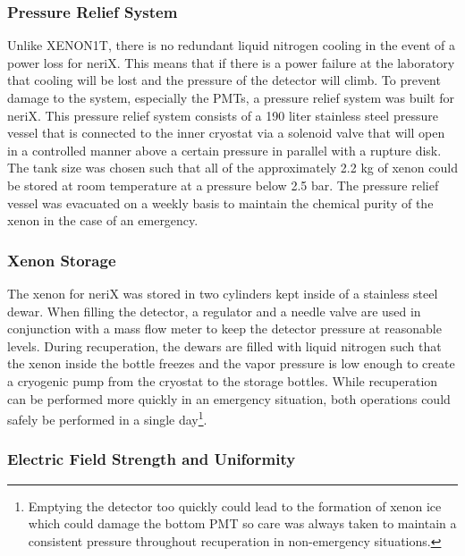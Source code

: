 \subsubsection{Pressure Relief System}

Unlike XENON1T, there is no redundant liquid nitrogen cooling in the event of a power loss for neriX.  This means that if there is a power failure at the laboratory that cooling will be lost and the pressure of the detector will climb.  To prevent damage to the system, especially the PMTs, a pressure relief system was built for neriX.  This pressure relief system consists of a 190 liter stainless steel pressure vessel that is connected to the inner cryostat via a solenoid valve that will open in a controlled manner above a certain pressure in parallel with a rupture disk.  The tank size was chosen such that all of the approximately 2.2 kg of xenon could be stored at room temperature at a pressure below 2.5 bar.  The pressure relief vessel was evacuated on a weekly basis to maintain the chemical purity of the xenon in the case of an emergency.


\subsubsection{Xenon Storage}

The xenon for neriX was stored in two cylinders kept inside of a stainless steel dewar.  When filling the detector, a regulator and a needle valve are used in conjunction with a mass flow meter to keep the detector pressure at reasonable levels.  During recuperation, the dewars are filled with liquid nitrogen such that the xenon inside the bottle freezes and the vapor pressure is low enough to create a cryogenic pump from the cryostat to the storage bottles.  While recuperation can be performed more quickly in an emergency situation, both operations could safely be performed in a single day\footnote{Emptying the detector too quickly could lead to the formation of xenon ice which could damage the bottom PMT so care was always taken to maintain a consistent pressure throughout recuperation in non-emergency situations.}.


\subsubsection{Electric Field Strength and Uniformity}


